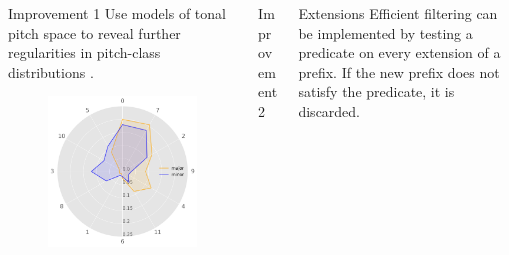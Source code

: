 \documentclass[final]{beamer}
\begin{document}
\begin{frame}[t]
\begin{minipage}[t][.56\textheight][t]{\textwidth}
\begin{columns}[t]
\begin{column}{0.3\textwidth}
      \begin{block}{Improvement 1}
        Use models of tonal pitch space to reveal further regularities in pitch-class distributions \autocite{Harasim2019}.
        \begin{figure}
          \centering
          \includegraphics[width=\textwidth]{img/radars}
        \end{figure}
      \end{block}

      \vspace{2em}

    \end{column}

    \begin{column}{0.3\textwidth}

      \begin{block}{Improvement 2}
        \blindtext
      \end{block}

    \end{column}

    \begin{column}{0.3\textwidth}

      \begin{block}{Extensions}
        Efficient \alert{filtering} can be implemented
        by \alert{testing a predicate} on every extension of a prefix.
        If the new prefix does not satisfy the predicate, it is discarded.


\end{block}
\end{column}
\end{columns}
\end{minipage}
\end{frame}
\end{document}
